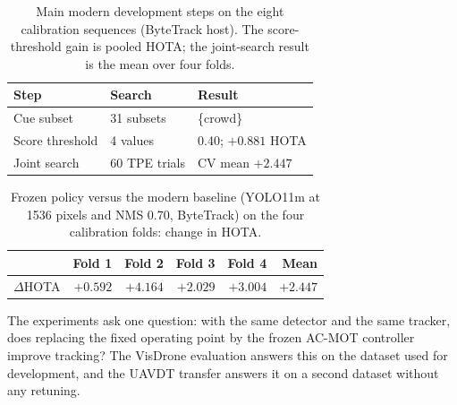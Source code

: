 \documentclass[pdflatex,sn-mathphys-num,iicol]{sn-jnl}
\makeatletter
\def\sectionfont{\reset@font\fontfamily{\rmdefault}\fontsize{11bp}{13bp}\bfseries\selectfont\raggedright\boldmath}
\renewcommand\section{\@startsection{section}{1}{\z@}{-8pt \@plus -2pt \@minus -2pt}{4pt}{\sectionfont}}
\makeatother
\begin{document}
\begin{table}[t]
\caption{Main modern development steps on the eight calibration sequences
(ByteTrack host). The score-threshold gain is pooled HOTA; the joint-search
result is the mean over four folds.}
\label{tab:devrecord}
\centering\footnotesize
\setlength{\tabcolsep}{3pt}
\begin{tabular}{@{}lll@{}}
\toprule
Step & Search & Result\\
\midrule
Cue subset & 31 subsets & \{crowd\}\\
Score threshold & 4 values & 0.40; $+0.881$ HOTA\\
Joint search & 60 TPE trials & CV mean $+2.447$\\
\bottomrule
\end{tabular}
\end{table}

\begin{table}[t]
\caption{Frozen policy versus the modern baseline (YOLO11m at 1536 pixels and
NMS 0.70, ByteTrack) on the four calibration folds: change in HOTA.}
\label{tab:folds}
\centering\footnotesize
\begin{tabular}{@{}lrrrrr@{}}
\toprule
 & Fold 1 & Fold 2 & Fold 3 & Fold 4 & Mean\\
\midrule
$\Delta$HOTA & $+0.592$ & $+4.164$ & $+2.029$ & $+3.004$ & $+2.447$\\
\bottomrule
\end{tabular}
\end{table}
\section{Results}\label{sec:results}

The experiments ask one question: with the same detector and the same
tracker, does replacing the fixed operating point by the frozen AC-MOT
controller improve tracking? The VisDrone evaluation answers this on the
dataset used for development, and the UAVDT transfer answers it on a second
dataset without any retuning.
\end{document}
